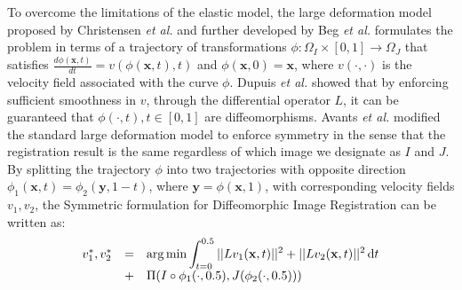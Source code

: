 To overcome the limitations of the elastic model, the large deformation model proposed by Christensen {\it et al.} \cite{Christensen2001} and further developed by Beg {\it et al.} \cite{Science2005} formulates the problem in terms of a trajectory of transformations \hbox{$\phi:\Omega_{I} \times [0, 1] \rightarrow \Omega_{J}$} that satisfies $\frac{d \phi(\mathbf{x}, t)}{dt} = v(\phi(\mathbf{x}, t), t)$ and $\phi(\mathbf{x}, 0) = \mathbf{x}$, where $v(\cdot, \cdot)$ is the velocity field associated with the curve $\phi$. Dupuis {\it et al.} \cite{Dupuis1998} showed that by enforcing sufficient smoothness in $v$, through the differential operator $L$, it can be guaranteed that $\phi(\cdot, t), t \in [0, 1]$ are diffeomorphisms. Avants {\it et al.} \cite{Avants2008, Avants2011} modified the standard large deformation model to enforce symmetry in the sense that the registration result is the same regardless of which image we designate as $I$ and $J$. By splitting the trajectory $\phi$ into two trajectories with opposite direction $\phi_{1}(\mathbf{x}, t) = \phi_{2}(\mathbf{y}, 1-t)$, where $\mathbf{y} = \phi(\mathbf{x}, 1)$, with corresponding velocity fields $v_{1}, v_{2}$, the Symmetric formulation for Diffeomorphic Image Registration \cite{Avants2008, Avants2011} can be written as:
\begin{equation}\label{eq:syn_energy}
    \begin{array}{lll}
        v_{1}^{*}, v_{2}^{*} &=& \mathlarger{\arg \min \int_{t=0}^{0.5} ||L v_{1}(\mathbf{x}, t)||^{2} + ||L v_{2}(\mathbf{x}, t)||^{2} \dif t}\\
        &+& \mathlarger{ \Pi(I \circ \phi_{1}(\cdot, 0.5), J(\phi_{2}(\cdot, 0.5)))}
    \end{array}
\end{equation}
